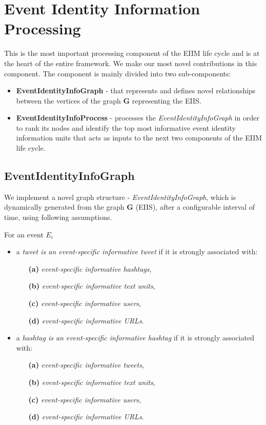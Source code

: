 \section{Event Identity Information Processing\label{EventIdentityInformationProcessing}}
This is the most important processing component of the EIIM life cycle and is at the heart of the entire framework. We make our most novel contributions in this component. The component is mainly divided into two sub-components:
\begin{itemize}
\item \textbf{EventIdentityInfoGraph} - that represents and defines novel relationships between the vertices of the graph $\mathbf{G}$ representing the EIIS.
\item \textbf{EventIdentityInfoProcess} - processes the \textit{EventIdentityInfoGraph} in order to rank its nodes and identify the top most informative event identity information units that acts as inputs to the next two components of the EIIM life cycle.
\end{itemize}

\subsection{EventIdentityInfoGraph\label{eventidentityinfograph}}

We implement a novel graph structure - \textit{EventIdentityInfoGraph}, which is dynamically generated from the graph $\mathbf{G}$ (EIIS), after a configurable interval of time, using following assumptions.
  
For an event $E_{i}$ 
\begin{itemize} 
\item a \textit{tweet is an event-specific informative tweet} if it is strongly associated with:
\begin{itemize}
\item[\textbf{(a)}] \textit{event-specific informative hashtags}, 
\item[\textbf{(b)}] \textit{event-specific informative text units}, 
\item[\textbf{(c)}] \textit{event-specific informative users},
\item[\textbf{(d)}] \textit{event-specific informative URLs}. 
\end{itemize}
\end{itemize}

\begin{itemize} 
\item a \textit{hashtag is an event-specific informative hashtag} if it is strongly associated with:
\begin{itemize}
\item[\textbf{(a)}] \textit{event-specific informative tweets},
\item[\textbf{(b)}] \textit{event-specific informative text units},
\item[\textbf{(c)}] \textit{event-specific informative users},
\item[\textbf{(d)}] \textit{event-specific informative URLs}.
\end{itemize}
\end{itemize}

